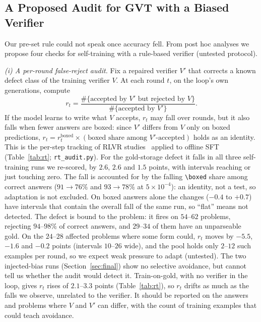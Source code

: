 \documentclass[runningheads]{llncs}
\begin{document}
\subsection{A Proposed Audit for GVT with a Biased Verifier}
\label{sec:audit}

Our pre-set rule could not speak once accuracy fell. From post hoc analyses we propose four
checks for self-training with a rule-based verifier (untested protocol).

\emph{(i) A per-round false-reject audit.} Fix a repaired verifier $V'$ that
corrects a known defect class of the training verifier $V$. At each round $t$,
on the loop's own generations, compute
\[
r_t = \frac{\#\{\text{accepted by } V' \text{ but rejected by } V\}}{\#\{\text{accepted by } V'\}} .
\]
If the model learns to write what $V$ accepts, $r_t$ may fall over rounds, but
it also falls when fewer answers are boxed: since $V'$ differs from $V$ only on boxed
predictions, $r_t=r_t^{\text{boxed}}\times(\text{boxed share among }V'\text{-accepted})$ holds as an identity. This is the per-step tracking of
RLVR studies~\cite{ref_delayplateau,ref_tinyv} applied to offline SFT (Table~\ref{tab:rt}; \texttt{rt\_audit.py}).
For the gold-storage defect it falls in all three self-training runs we re-scored,
by $2.6$, $2.6$ and $1.5$ points, with intervals reaching or just touching
zero. The fall is accounted for by the falling
\verb|\boxed| share among correct answers ($91\to76\%$ and $93\to78\%$ at
$5\times10^{-4}$): an identity, not a test, so adaptation is not excluded. On boxed answers alone the changes ($-0.4$ to $+0.7$) have intervals
that contain the overall fall of the same run, so ``flat'' means not detected. The defect is bound to the problem: it fires on $54$--$62$
problems, rejecting $94$--$98\%$ of correct answers, and $29$--$34$ of them have an unparseable gold. On the $24$--$28$ affected
problems where some form could, $r_t$ moves by $-5.5$, $-1.6$ and $-0.2$
points (intervals $10$--$26$ wide), and the pool
holds only $2$--$12$ such examples per round, so we expect weak pressure to adapt (untested). The two injected-bias runs
(Section~\ref{sec:final}) show no selective avoidance, but cannot tell us whether the audit would detect it.
Train-on-gold, with no verifier in the loop, gives
$r_t$ rises of $2.1$--$3.3$ points (Table~\ref{tab:rt}), so $r_t$ drifts as much as the falls we observe, unrelated to
the verifier. It should be reported on
the answers and problems where $V$ and $V'$ can differ, with the count of training examples that could teach avoidance.
\end{document}
